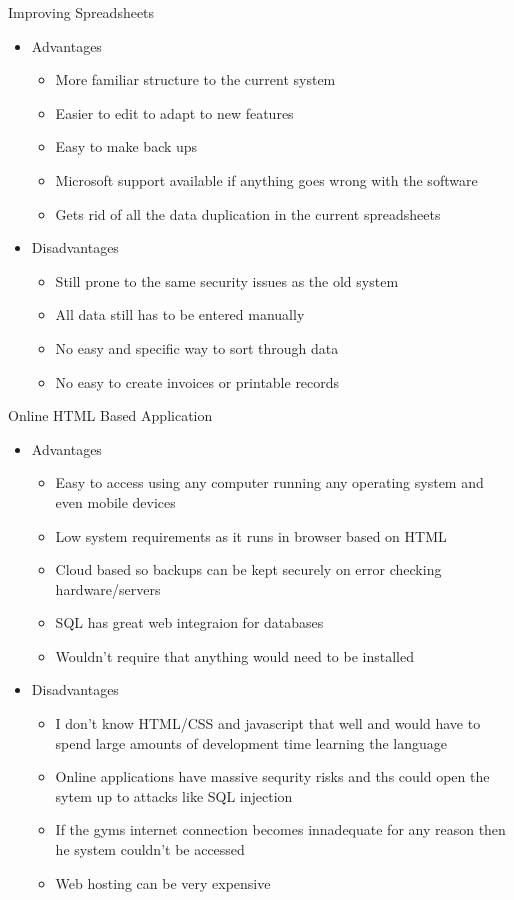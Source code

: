 Improving Spreadsheets
\begin{itemize}
    \item Advantages
    \begin{itemize}
        \item More familiar structure to the current system
        \item Easier to edit to adapt to new features
        \item Easy to make back ups
        \item Microsoft support available if anything goes wrong with the software
        \item Gets rid of all the data duplication in the current spreadsheets
    \end{itemize}
    \item Disadvantages
    \begin{itemize}
        \item Still prone to the same security issues as the old system
        \item All data still has to be entered manually
        \item No easy and specific way to sort through data
        \item No easy to create invoices or printable records
    \end{itemize}
\end{itemize}

Online HTML Based Application

\begin{itemize}
    \item Advantages
    \begin{itemize}
        \item Easy to access using any computer running any operating system and even mobile devices
        \item Low system requirements as it runs in browser based on HTML
        \item Cloud based so backups can be kept securely on error checking hardware/servers
        \item SQL has great web integraion for databases
        \item Wouldn't require that anything would need to be installed
    \end{itemize}
    \item Disadvantages
    \begin{itemize}
        \item I don't know HTML/CSS and javascript that well and would have to spend large amounts of development time learning the language
        \item Online applications have massive sequrity risks and ths could open the sytem up to attacks like SQL injection
        \item If the gyms internet connection becomes innadequate for any reason then he system couldn't be accessed
        \item Web hosting can be very expensive 
    \end{itemize}
\end{itemize}

